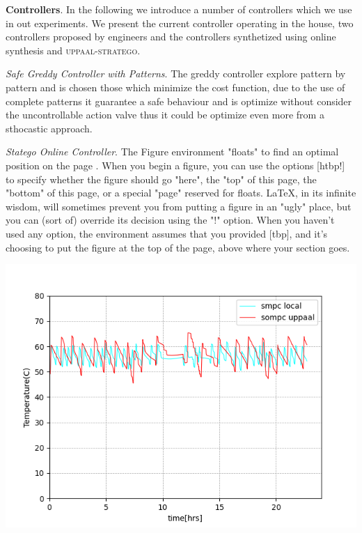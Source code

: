     \textbf{Controllers}. In the following we introduce a number of controllers
    which we use in out experiments. We present the current controller operating
    in the house, two controllers proposed by engineers and the controllers 
    synthetized using online synthesis and \textsc{uppaal-stratego}.


    \emph{Safe Greddy Controller with Patterns}. 
    The greddy controller explore pattern by pattern and is chosen those which minimize
    the cost function, due to the use of complete patterns it guarantee a safe 
    behaviour and is optimize without consider the uncontrollable action 
    valve thus it could be optimize even more from a sthocastic approach.

    \emph{Statego Online Controller}.
    The Figure environment "floats" to find an optimal position on the page
    . When you begin a figure, you can use the options [htbp!] to specify whether 
    the figure should go "here", the "top" of this page, the "bottom" of this page,
     or a special "page" reserved for floats. LaTeX, in its infinite wisdom,
      will sometimes prevent you from putting a figure in an "ugly" place, 
      but you can (sort of) override its decision using the "!" option. 
      When you haven't used any option, the environment assumes that you
       provided [tbp], and it's choosing to put the figure at the top of
        the page, above where your section goes.

        
    \begin{minipage}{\linewidth}
      \begin{center}
          \includegraphics[width=0.8\linewidth]{images/controllers}
      \end{center}
      \label{uncontrollableactions}
    \end{minipage}

